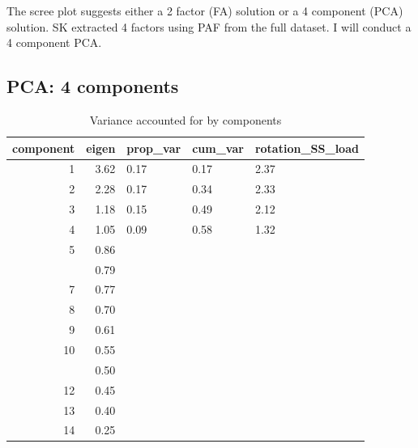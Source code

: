 \documentclass[]{article}
\begin{document}
The scree plot suggests either a 2 factor (FA) solution or a 4 component
(PCA) solution. SK extracted 4 factors using PAF from the full dataset.
I will conduct a 4 component PCA.

\hypertarget{pca-4-components}{%
\subsection{PCA: 4 components}\label{pca-4-components}}

\begin{table}[H]

\caption{\label{tab:unnamed-chunk-21}Variance accounted for by components}
\centering
\fontsize{6}{8}\selectfont
\begin{tabular}[t]{rrlll}
\toprule
component & eigen & prop\_var & cum\_var & rotation\_SS\_load\\
\midrule
1 & 3.62 & 0.17 & 0.17 & 2.37\\
2 & 2.28 & 0.17 & 0.34 & 2.33\\
3 & 1.18 & 0.15 & 0.49 & 2.12\\
4 & 1.05 & 0.09 & 0.58 & 1.32\\
5 & 0.86 &  &  & \\
\addlinespace
6 & 0.79 &  &  & \\
7 & 0.77 &  &  & \\
8 & 0.70 &  &  & \\
9 & 0.61 &  &  & \\
10 & 0.55 &  &  & \\
\addlinespace
11 & 0.50 &  &  & \\
12 & 0.45 &  &  & \\
13 & 0.40 &  &  & \\
14 & 0.25 &  &  & \\
\bottomrule
\end{tabular}
\end{table}
\end{document}
